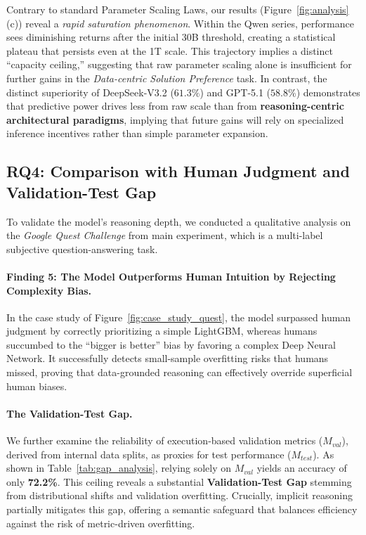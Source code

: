 Contrary to standard Parameter Scaling Laws, our results (Figure~\ref{fig:analysis}(c)) reveal a \textit{rapid saturation phenomenon}.
Within the Qwen series, performance sees diminishing returns after the initial 30B threshold, creating a statistical plateau that persists even at the 1T scale.
This trajectory implies a distinct ``capacity ceiling,'' suggesting that raw parameter scaling alone is insufficient for further gains in the \textit{Data-centric Solution Preference} task.
In contrast, the distinct superiority of DeepSeek-V3.2 ($61.3\%$) and GPT-5.1 ($58.8\%$) demonstrates that predictive power drives less from raw scale than from \textbf{reasoning-centric architectural paradigms}, implying that future gains will rely on specialized inference incentives rather than simple parameter expansion.



\subsection{RQ4: Comparison with Human Judgment and Validation-Test Gap}
\label{subsec:rq4_cases}


To validate the model's reasoning depth, we conducted a qualitative analysis on the \textit{Google Quest Challenge} from main experiment, which is a multi-label subjective question-answering task.

\paragraph{Finding 5: The Model Outperforms Human Intuition by Rejecting Complexity Bias.}

In the case study of Figure~\ref{fig:case_study_quest}, the model surpassed human judgment by correctly prioritizing a simple LightGBM, whereas humans succumbed to the ``bigger is better'' bias by favoring a complex Deep Neural Network.
It successfully detects small-sample overfitting risks that humans missed, proving that data-grounded reasoning can effectively override superficial human biases.


\paragraph{The Validation-Test Gap.}
We further examine the reliability of execution-based validation metrics ($M_{val}$), derived from internal data splits, as proxies for test performance ($M_{test}$).
As shown in Table~\ref{tab:gap_analysis}, relying solely on $M_{val}$ yields an accuracy of only \textbf{72.2\%}.
This ceiling reveals a substantial \textbf{Validation-Test Gap} stemming from distributional shifts and validation overfitting.
Crucially, implicit reasoning partially mitigates this gap, offering a semantic safeguard that balances efficiency against the risk of metric-driven overfitting.

